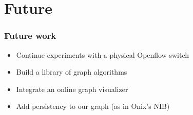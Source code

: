 \section{Future}

%
%
\begin{frame}\frametitle{Future work}

    \begin{itemize}
        \item Continue experiments with a physical Openflow switch
        \item Build a library of graph algorithms
        \item Integrate an online graph visualizer
        \item Add persistency to our graph (as in Onix's NIB)
    \end{itemize}

\end{frame}
